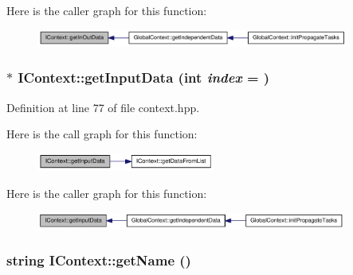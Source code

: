 Here is the caller graph for this function:\nopagebreak
\begin{figure}[H]
\begin{center}
\leavevmode
\includegraphics[width=290pt]{class_i_context_ab62e24ee67cb0f7355a0671afd0cbe10_icgraph}
\end{center}
\end{figure}
\hypertarget{class_i_context_a9e625b1922446c14cf63f712521788b4}{
\subsubsection[{getInputData}]{$\ast$ IContext::getInputData (int {\em index} = {})}}
\label{class_i_context_a9e625b1922446c14cf63f712521788b4}


Definition at line 77 of file context.hpp.

Here is the call graph for this function:\nopagebreak
\begin{figure}[H]
\begin{center}
\leavevmode
\includegraphics[width=165pt]{class_i_context_a9e625b1922446c14cf63f712521788b4_cgraph}
\end{center}
\end{figure}


Here is the caller graph for this function:\nopagebreak
\begin{figure}[H]
\begin{center}
\leavevmode
\includegraphics[width=288pt]{class_i_context_a9e625b1922446c14cf63f712521788b4_icgraph}
\end{center}
\end{figure}
\hypertarget{class_i_context_a607d8609c589bfa7937b5a8313c61d04}{
\subsubsection[{getName}]{\setlength{\rightskip}{0pt plus 5cm}string IContext::getName ()}}
\label{class_i_context_a607d8609c589bfa7937b5a8313c61d04}


